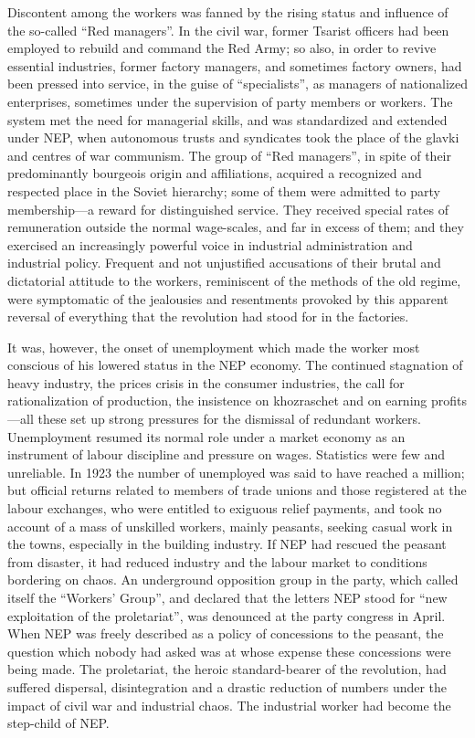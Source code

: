 Discontent among the workers was fanned by the rising status and influence of the so-called ``Red managers''. In the civil war, former Tsarist officers had been employed to rebuild and command the Red Army; so also, in order to revive essential industries, former factory managers, and sometimes factory owners, had been pressed into service, in the guise of ``specialists'', as managers of nationalized enterprises, sometimes under the supervision of party members or workers. The system met the need for managerial skills, and was standardized and extended under NEP, when autonomous trusts and syndicates took the place of the glavki and centres of war communism. The group of ``Red managers'', in spite of their predominantly bourgeois origin and affiliations, acquired a recognized and respected place in the Soviet hierarchy; some of them were admitted to party membership---a reward for distinguished service. They received special rates of remuneration outside the normal wage-scales, and far in excess of them; and they exercised an increasingly powerful voice in industrial administration and industrial policy. Frequent and not unjustified accusations of their brutal and dictatorial attitude to the workers, reminiscent of the methods of the old regime, were symptomatic of the jealousies and resentments provoked by this apparent reversal of everything that the revolution had stood for in the factories. 

It was, however, the onset of unemployment which made the worker most conscious of his lowered status in the NEP economy. The continued stagnation of heavy industry, the prices crisis in the consumer industries, the call for rationalization of production, the insistence on khozraschet and on earning profits---all these set up strong pressures for the dismissal of redundant workers. Unemployment resumed its normal role under a market economy as an instrument of labour discipline and pressure on wages. Statistics were few and unreliable. In 1923 the number of unemployed was said to have reached a million; but official returns related to members of trade unions and those registered at the labour exchanges, who were entitled to exiguous relief payments, and took no account of a mass of unskilled workers, mainly peasants, seeking casual work in the towns, especially in the building industry. If NEP had rescued the peasant from disaster, it had reduced industry and the labour market to conditions bordering on chaos. An underground opposition group in the party, which called itself the ``Workers' Group'', and declared that the letters NEP stood for ``new exploitation of the proletariat'', was denounced at the party congress in April. When NEP was freely described as a policy of concessions to the peasant, the question which nobody had asked was at whose expense these concessions were being made. The proletariat, the heroic standard-bearer of the revolution, had suffered dispersal, disintegration and a drastic reduction of numbers under the impact of civil war and industrial chaos. The industrial worker had become the step-child of NEP. 

